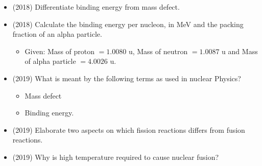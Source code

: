 \documentclass{article}
\begin{document}
\begin{itemize}
\item (2018)  Differentiate binding energy from mass defect.
\item (2018)  Calculate the binding energy per nucleon, in MeV and the packing fraction of an alpha particle.
 \begin{itemize}
\item Given: Mass of proton $ =1.0080$ u, Mass of neutron $ =1.0087$ u and Mass of alpha particle $ =4.0026$ u.
\end{itemize}
\item (2019)  What is meant by the following terms as used in nuclear Physics?
 \begin{itemize}
\item Mass defect 
\item Binding energy. 
\end{itemize}
\item (2019)  Elaborate two aspects on which fission reactions differs from fusion reactions.
\item (2019)  Why is high temperature required to cause nuclear fusion? 
\end{itemize}
\end{document}
